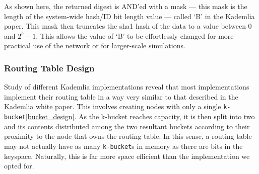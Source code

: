 \documentclass[12pt]{report}
\newcommand{\code}[1]{\colorbox{codegray}{\texttt{#1}}}
\begin{document}
            As shown here, the returned digest is AND'ed with a mask --- this
            mask is the length of the system-wide hash/ID bit length value ---
            called `B' in the Kademlia paper.  This mask then truncates the
            sha1 hash of the data to a value between 0 and $2^b-1$.  This
            allows the value of `B' to be effortlessly changed for more
            practical use of the network or for larger-scale simulations.

            \subsubsection{Routing Table Design} \label{routing_table_design}
                Study of different Kademlia
                implementations\cite{implementation_01}\cite{implementation_02}\cite{implementation_03}\cite{implementation_04}
                reveal that most implementations implement their routing table
                in a way very similar to that described in the Kademlia white
                paper\cite{kademlia}.  This involves creating nodes with only a
                single \code{k-bucket}\ref{bucket_design}.  As the k-bucket
                reaches capacity, it is then split into two and its contents
                distributed among the two resultant buckets according to their
                proximity to the node that owns the routing table.  In this
                sense, a routing table may not actually have as many
                \code{k-bucket}s
                in memory as there are bits in the keyspace.  Naturally, this
                is far more space efficient than the implementation we opted
                for.
\end{document}
